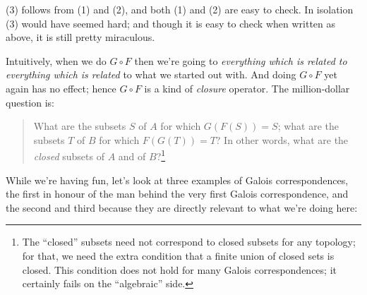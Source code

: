 \documentclass[a4paper]{amsart}
\begin{document}
(3) follows from (1) and (2), and both (1) and (2) are easy to
check. In isolation (3) would have seemed hard; and though it is easy
to check when written as above, it is still pretty miraculous.

Intuitively, when we do $G \circ F$ then we're going to {\em
  everything which is related to everything which is related} to what
we started out with. And doing $G \circ F$ yet again has no effect;
hence $G \circ F$ is a kind of {\em closure} operator. The
million-dollar question is:

\begin{quote}
  What are the subsets $S$ of $A$ for which $G(F(S)) = S$; what are
  the subsets $T$ of $B$ for which $F(G(T)) = T$? In other words, what
  are the {\em closed} subsets of $A$ and of $B$?\footnote{The
    ``closed'' subsets need not correspond to closed subsets for any
    topology; for that, we need the extra condition that a finite
    union of closed sets is closed. This condition does not hold for
    many Galois correspondences; it certainly fails on the
    ``algebraic'' side.}
\end{quote}

While we're having fun, let's look at three examples of Galois
correspondences, the first in honour of the man behind the very first
Galois correspondence, and the second and third because they are
directly relevant to what we're doing here:
\end{document}
